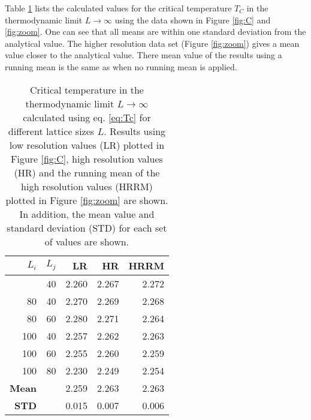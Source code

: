 Table \ref{tab:Tc} lists the calculated values for the critical temperature $T_C$ in the thermodynamic limit $L \rightarrow \infty$  using the data shown in Figure \ref{fig:C} and \ref{fig:zoom}. One can see that all means are within one standard deviation from the analytical value. The higher resolution data set (Figure \ref{fig:zoom}) gives a mean value closer to the analytical value. There mean value of the results using a running mean is the same as when no running mean is applied. 
\begin{table}[]
	\centering
	\begin{tabular}{rrrrr}
		$L_i$         & $L_j$ & LR  & HR & HRRM \\
		\hline
		\addlinespace[0.1cm]
		60            & 40    & 2.260 & 2.267 & 2.272     \\
		80            & 40    & 2.270 & 2.269 & 2.268     \\
		80            & 60    & 2.280 & 2.271 & 2.264     \\
		100           & 40    & 2.257 & 2.262 & 2.263     \\
		100           & 60    & 2.255 & 2.260 & 2.259     \\
		100           & 80    & 2.230 & 2.249 & 2.254     \\
		\hline
		\addlinespace[0.1cm]
		\textbf{Mean} &       & 2.259 & 2.263 & 2.263     \\
		\textbf{STD}  &       & 0.015 & 0.007 & 0.006    
	\end{tabular}
	\caption{Critical temperature in the thermodynamic limit $L \rightarrow \infty$ calculated using eq. \ref{eq:Tc} for different lattice sizes $L$. Results using low resolution values (LR) plotted in Figure \ref{fig:C}, high resolution values (HR) and the running mean of the high resolution values (HRRM) plotted in Figure \ref{fig:zoom} are shown. In addition, the mean value and standard deviation (STD) for each set of values are shown.}
	\label{tab:Tc}
\end{table}
